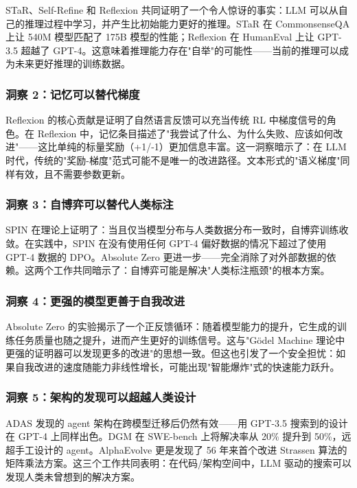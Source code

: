 STaR、Self-Refine 和 Reflexion 共同证明了一个令人惊讶的事实：LLM 可以从自己的推理过程中学习，并产生比初始能力更好的推理。STaR 在 CommonsenseQA 上让 540M 模型匹配了 175B 模型的性能；Reflexion 在 HumanEval 上让 GPT-3.5 超越了 GPT-4。这意味着推理能力存在"自举"的可能性——当前的推理可以成为未来更好推理的训练数据。

\subsubsection{洞察 2：记忆可以替代梯度}

Reflexion 的核心贡献是证明了自然语言反馈可以充当传统 RL 中梯度信号的角色。在 Reflexion 中，记忆条目描述了"我尝试了什么、为什么失败、应该如何改进"——这比单纯的标量奖励（+1/-1）更加信息丰富。这一洞察暗示了：在 LLM 时代，传统的"奖励-梯度"范式可能不是唯一的改进路径。文本形式的"语义梯度"同样有效，且不需要参数更新。

\subsubsection{洞察 3：自博弈可以替代人类标注}

SPIN 在理论上证明了：当且仅当模型分布与人类数据分布一致时，自博弈训练收敛。在实践中，SPIN 在没有使用任何 GPT-4 偏好数据的情况下超过了使用 GPT-4 数据的 DPO。Absolute Zero 更进一步——完全消除了对外部数据的依赖。这两个工作共同暗示了：自博弈可能是解决"人类标注瓶颈"的根本方案。

\subsubsection{洞察 4：更强的模型更善于自我改进}

Absolute Zero 的实验揭示了一个正反馈循环：随着模型能力的提升，它生成的训练任务质量也随之提升，进而产生更好的训练信号。这与"Gödel Machine 理论中更强的证明器可以发现更多的改进"的思想一致。但这也引发了一个安全担忧：如果自我改进的速度随能力非线性增长，可能出现"智能爆炸"式的快速能力跃升。

\subsubsection{洞察 5：架构的发现可以超越人类设计}

ADAS 发现的 agent 架构在跨模型迁移后仍然有效——用 GPT-3.5 搜索到的设计在 GPT-4 上同样出色。DGM 在 SWE-bench 上将解决率从 20\% 提升到 50\%，远超手工设计的 agent。AlphaEvolve 更是发现了 56 年来首个改进 Strassen 算法的矩阵乘法方案。这三个工作共同表明：在代码/架构空间中，LLM 驱动的搜索可以发现人类未曾想到的解决方案。

